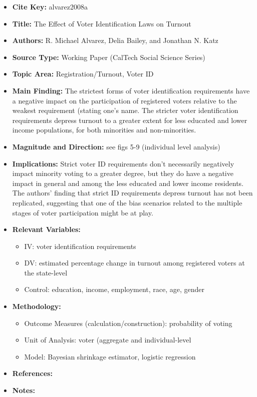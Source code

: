 %

\textbf{\citet{alvarez2008a}}
\begin{itemize}
	\item \textbf{Cite Key:} alvarez2008a
	\item \textbf{Title​:} The Effect of Voter Identification Laws on Turnout
	\item \textbf{Authors​:} R. Michael Alvarez, Delia Bailey, and Jonathan N. Katz
	\item \textbf{Source Type​:} Working Paper (CalTech Social Science Series)
	\item \textbf{Topic Area​:} Registration/Turnout, Voter ID
	\item \textbf{Main Finding​:} The strictest forms of voter identification requirements have a negative impact on the participation of registered voters relative to the weakest requirement (stating one’s name. The stricter voter identification requirements depress turnout to a greater extent for less educated and lower income populations, for both minorities and non-minorities.
	\item \textbf{Magnitude and Direction​:} see figs 5-9 (individual level analysis)
	\item \textbf{Implications​:} Strict voter ID requirements don’t necessarily negatively impact minority voting to a greater degree, but they do have a negative impact in general and among the less educated and lower income residents. The authors’ finding that strict ID requirements depress turnout has not been replicated, suggesting that one of the bias scenarios related to the multiple stages of voter participation might be at play.
	\item \textbf{Relevant Variables​:}
	\begin{itemize}
		\item IV: voter identification requirements
		\item DV: estimated percentage change in turnout among registered voters at the state-level
		\item Control: education, income, employment, race, age, gender
	\end{itemize}
		\item \textbf{Methodology​:}
	\begin{itemize}
		\item Outcome Measures (calculation/construction): probability of voting
		\item Unit of Analysis: voter (aggregate and individual-level
		\item Model: Bayesian shrinkage estimator, logistic regression
	\end{itemize}
	\item \textbf{References:}
	\item \textbf{Notes:}
\end{itemize}

%